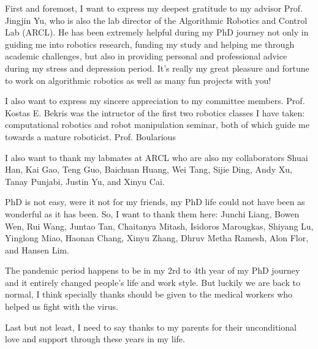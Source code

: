 
\begin{acknowledgments}
First and foremost, I want to express my deepest gratitude to my advisor Prof. Jingjin Yu, 
who is also the lab director of the Algorithmic Robotics and Control Lab (ARCL). 
He has been extremely helpful during my PhD journey 
not only in guiding me into robotics research, funding my study and helping me through academic challenges,
but also in providing personal and professional advice during my stress and depression period. 
It's really my great pleasure and fortune to work on algorithmic robotics 
as well as many fun projects with you! 

I also want to express my sincere appreciation to my committee members. 
Prof. Kostas E. Bekris was the intructor of the first two robotics classes I have taken: 
computational robotics and robot manipulation seminar, both of which guide me
towards a mature roboticist. Prof. Boularious 

I also want to thank my labmates at ARCL who are also my collaborators Shuai Han, 
Kai Gao, Teng Guo, Baichuan Huang, Wei Tang, Sijie Ding, Andy Xu, Tanay Punjabi, 
Justin Yu, and Xinyu Cai.

PhD is not easy, were it not for my friends, my PhD life
could not have been as wonderful as it has been. 
So, I want to thank them here: Junchi Liang, Bowen Wen, Rui Wang, Juntao Tan, Chaitanya Mitash, 
Isidoros Marougkas, Shiyang Lu, Yinglong Miao, Haonan Chang, Xinyu Zhang, 
Dhruv Metha Ramesh, Alon Flor, and Hansen Lim. 

The pandemic period happens to be in my 2rd to 4th year of my PhD journey and it entirely changed people's
life and work style. But luckily we are back to normal, I think specially thanks should be given to the medical workers
who helped us fight with the virus.

Last but not least, I need to say thanks to my parents for their unconditional love
and support through these years in my life. 

\end{acknowledgments}
